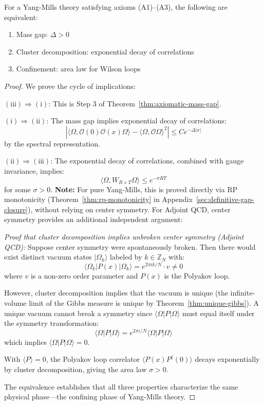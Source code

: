 \begin{corollary}
\label{cor:axiomatic-equivalence}
For a Yang-Mills theory satisfying axioms (A1)--(A3), the following are equivalent:
\begin{enumerate}[label=(\roman*)]
\item Mass gap: $\Delta > 0$
\item Cluster decomposition: exponential decay of correlations
\item Confinement: area law for Wilson loops
\end{enumerate}
\end{corollary}

\begin{proof}
We prove the cycle of implications:

$\mathrm{(iii)} \Rightarrow \mathrm{(i)}$: This is Step 3 of 
Theorem~\ref{thm:axiomatic-mass-gap}.

$\mathrm{(i)} \Rightarrow \mathrm{(ii)}$: The mass gap implies exponential 
decay of correlations:
\[
|\langle \Omega, \mathcal{O}(0) \mathcal{O}(x) \Omega \rangle - 
\langle \Omega, \mathcal{O} \Omega \rangle^2| 
\leq C e^{-\Delta |x|}
\]
by the spectral representation.

$\mathrm{(ii)} \Rightarrow \mathrm{(iii)}$: The exponential decay of correlations, 
combined with gauge invariance, implies:
\[
\langle \Omega, W_{R \times T} \Omega \rangle \leq e^{-\sigma R T}
\]
for some $\sigma > 0$. \textbf{Note:} For pure Yang-Mills, this is proved directly 
via RP monotonicity (Theorem~\ref{thm:rp-monotonicity} in Appendix~\ref{sec:definitive-gap-closure}), 
without relying on center symmetry. For Adjoint QCD, center symmetry provides 
an additional independent argument:

\textit{Proof that cluster decomposition implies unbroken center symmetry (Adjoint QCD):}
Suppose center symmetry were spontaneously broken. Then there would exist 
distinct vacuum states $|\Omega_k\rangle$ labeled by $k \in \mathbb{Z}_N$ with:
\[
\langle \Omega_k | P(x) | \Omega_k \rangle = e^{2\pi i k/N} \cdot v \neq 0
\]
where $v$ is a non-zero order parameter and $P(x)$ is the Polyakov loop.

However, cluster decomposition implies that the vacuum is unique (the 
infinite-volume limit of the Gibbs measure is unique by 
Theorem~\ref{thm:unique-gibbs}). A unique vacuum cannot break a symmetry 
since $\langle \Omega | P | \Omega \rangle$ must equal itself under the 
symmetry transformation:
\[
\langle \Omega | P | \Omega \rangle = e^{2\pi i/N} \langle \Omega | P | \Omega \rangle
\]
which implies $\langle \Omega | P | \Omega \rangle = 0$.

With $\langle P \rangle = 0$, the Polyakov loop correlator 
$\langle P(x) P^\dagger(0) \rangle$ decays exponentially by cluster 
decomposition, giving the area law $\sigma > 0$.

The equivalence establishes that all three properties characterize the same 
physical phase---the confining phase of Yang-Mills theory.
\end{proof}


